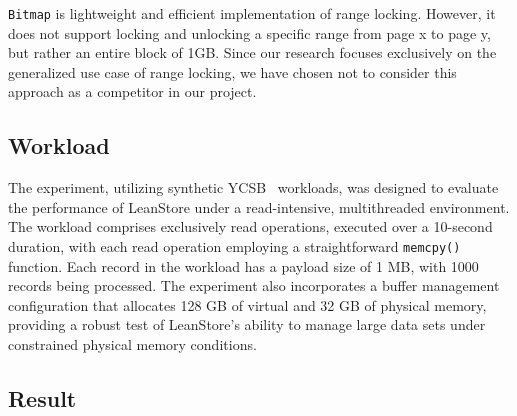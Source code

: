 \texttt{Bitmap} is lightweight and efficient implementation of range locking.
However, it does not support locking and unlocking a specific range from page x to page y, but rather an entire block of 1GB. 
Since our research focuses exclusively on the generalized use case of range locking, we have chosen not to consider this approach as a competitor in our project.

\subsection{Workload}

The experiment, utilizing synthetic YCSB~\parencite{cooper2010benchmarking} workloads, was designed to evaluate the performance of LeanStore under a read-intensive, multithreaded environment. 
The workload comprises exclusively read operations, executed over a 10-second duration, with each read operation employing a straightforward \texttt{memcpy()} function. Each record in the workload has a payload size of 1 MB, with 1000 records being processed. 
The experiment also incorporates a buffer management configuration that allocates 128 GB of virtual and 32 GB of physical memory, providing a robust test of LeanStore's ability to manage large data sets under constrained physical memory conditions.

\subsection{Result}

